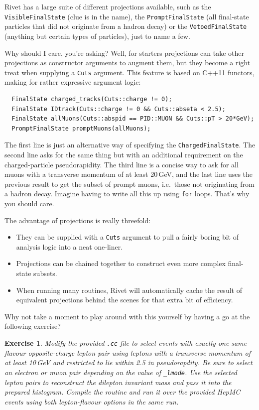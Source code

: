 \documentclass[10pt,fleqn]{scrartcl}
\theoremstyle{exstyle}
\newtheorem{exercise}{Exercise}
\begin{document}
Rivet has a large suite of different projections available,
such as the \verb|VisibleFinalState| (clue is in the name),
the \verb|PromptFinalState| (all final-state particles that 
did not originate from a hadron decay) 
or the \verb|VetoedFinalState| (anything but certain types of
particles), just to name a few. 

Why should I care, you're asking? 
Well, for starters projections can take other projections 
as constructor arguments to augment them, 
but they become a right treat when supplying
a \verb|Cuts| argument. This feature is based on C++11 functors, 
making for rather expressive argument logic:
\begin{verbatim}
  FinalState charged_tracks(Cuts::charge != 0);
  FinalState IDtrack(Cuts::charge != 0 && Cuts::abseta < 2.5);
  FinalState allMuons(Cuts::abspid == PID::MUON && Cuts::pT > 20*GeV);
  PromptFinalState promptMuons(allMuons);
\end{verbatim}
The first line is just an alternative way of specifying the
\verb|ChargedFinalState|. 
The second line asks for the same thing but with an additional
requirement on the charged-particle pseudorapidity.
The third line is a concise way to ask for all muons with a 
transverse momentum of at least 20\,GeV, and the last line 
uses the previous result to get the subset of prompt muons,
i.e.\ those not originating from a hadron decay.
Imagine having to write all this up using \verb|for| loops.
That's why you should care.

The advantage of projections is really threefold:
\begin{itemize}
\item They can be supplied with a \verb|Cuts| argument to pull a fairly boring bit of analysis logic
      into a neat one-liner.
\item Projections can be chained together to construct even more complex final-state subsets.
\item When running many routines, Rivet will automatically cache the result of equivalent
      projections behind the scenes for that extra bit of efficiency.
\end{itemize}
Why not take a moment to play around with this yourself by having a go
at the following exercise?

\begin{exercise}
Modify the provided \verb|.cc| file to select events with exactly one same-flavour 
opposite-charge lepton pair using leptons with a transverse momentum of at least 10\,GeV 
and restricted to lie within 2.5 in pseudorapdity.
Be sure to select an electron or muon pair depending on the value of \verb|_lmode|.
Use the selected lepton pairs to reconstruct the dilepton invariant mass and 
pass it into the prepared histogram. Compile the routine and run it over
the provided HepMC events using both lepton-flavour options in the same run.
\end{exercise}
\end{document}
